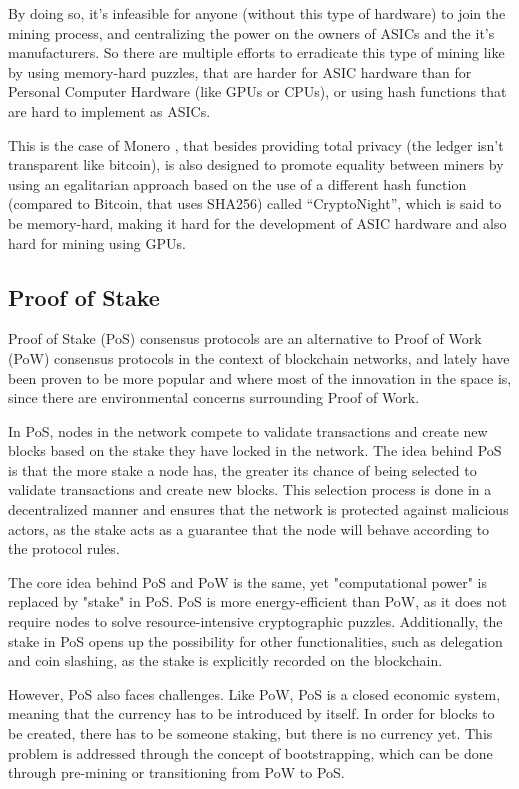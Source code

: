 By doing so, it's infeasible for anyone (without this type of hardware) to join the mining process, and centralizing the power on the owners of ASICs and the it's manufacturers. So there are multiple efforts to erradicate this type of mining like by using memory-hard puzzles, that are harder for ASIC hardware than for Personal Computer Hardware (like GPUs or CPUs), or using hash functions that are hard to implement as ASICs.

This is the case of Monero \cite{getmonero.org}, that besides providing total privacy (the ledger isn't transparent like bitcoin), is also designed to promote equality between miners by using an egalitarian approach based on the use of a different hash function (compared to Bitcoin, that uses SHA256) called ``CryptoNight'', which is said to be memory-hard, making it hard for the development of ASIC hardware and also hard for mining using GPUs. 

\subsection*{\textbf{Proof of Stake}}
Proof of Stake (PoS) consensus protocols are an alternative to Proof of Work (PoW) consensus protocols in the context of blockchain networks, and lately have been proven to be more popular and where most of the innovation in the space is, since there are environmental concerns surrounding Proof of Work.

In PoS, nodes in the network compete to validate transactions and create new blocks based on the stake they have locked in the network.
The idea behind PoS is that the more stake a node has, the greater its chance of being selected to validate transactions and create new blocks. This selection process is done in a decentralized manner and ensures that the network is protected against malicious actors, as the stake acts as a guarantee that the node will behave according to the protocol rules.

The core idea behind PoS and PoW is the same, yet "computational power" is replaced by "stake" in PoS. PoS is more energy-efficient than PoW, as it does not require nodes to solve resource-intensive cryptographic puzzles. Additionally, the stake in PoS opens up the possibility for other functionalities, such as delegation and coin slashing, as the stake is explicitly recorded on the blockchain.

However, PoS also faces challenges. Like PoW, PoS is a closed economic system, meaning that the currency has to be introduced by itself. In order for blocks to be created, there has to be someone staking, but there is no currency yet. This problem is addressed through the concept of bootstrapping, which can be done through pre-mining or transitioning from PoW to PoS.


